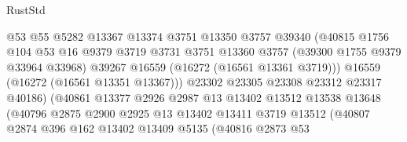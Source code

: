 \begin{lexlean}{RustStd}
\begin{coremodule}
                                    @53
                                    @55
                                    @5282
                                    @13367
                                    @13374
                                    @3751
                                    @13350
                                    @3757
                                    @39340
                                    (@40815
                                      @1756
                                      @104
                                      @53
                                      @16
                                      @9379
                                      @3719
                                      @3731
                                      @3751
                                      @13360
                                      @3757
                                      (@39300 @1755 @9379 @33964 @33968)
                                      @39267
                                      @16559
                                      (@16272 (@16561 @13361 @3719)))
                                    @16559
                                    (@16272 (@16561 @13351 @13367)))
                                  @23302
                                  @23305
                                  @23308
                                  @23312
                                  @23317
                                  @40186)
                                (@40861
                                  @13377
                                  @2926
                                  @2987
                                  @13
                                  @13402
                                  @13512
                                  @13538
                                  @13648
                                  (@40796
                                    @2875
                                    @2900
                                    @2925
                                    @13
                                    @13402
                                    @13411
                                    @3719
                                    @13512
                                    (@40807
                                      @2874
                                      @396
                                      @162
                                      @13402
                                      @13409
                                      @5135
                                      (@40816
                                        @2873
                                        @53

\end{coremodule}
\end{lexlean}

